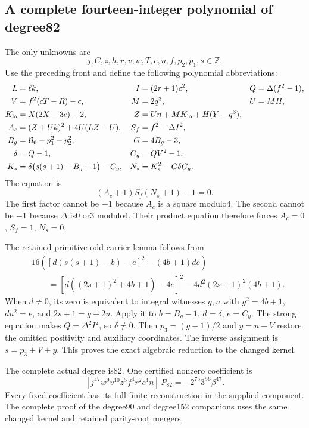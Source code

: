 \subsection{A complete fourteen-integer polynomial of degree82}
The only unknowns are
\[
 j,C,z,h,r,v,w,T,c,n,f,p_2,p_1,s\in\mathbb Z.
\]
Use the preceding front and define the following polynomial abbreviations:
\begin{align*}
 L&=\ell k,& I&=(2r+1)c^2,&Q&=\Delta(f^2-1),\\
 V&=f^2(cT-R)-c,& M&=2q^3,&U&=MH,\\
 K_{\rm lo}&=X(2X-3c)-2,
 &Z&=Un+MK_{\rm lo}+H(Y-q^3),\\
 A_c&=(Z+Uk)^2+4U(LZ-U),
 &S_f&=f^2-\Delta I^2,\\
 B_g&=\mathcal B_6-p_1^2-p_2^2,
 &G&=4B_g-3,\\
 \delta&=Q-1,&C_y&=QV^2-1,\\
 K_s&=\delta\bigl(s(s+1)-B_g+1\bigr)-C_y,
 &N_s&=K_s^2-G\delta C_y.
\end{align*}
The equation is
\begin{equation}\label{eq:integer82}
 \boxed{(A_c+1)S_f(N_s+1)-1=0.}
\end{equation}
The first factor cannot be $-1$ because $A_c$ is a square modulo4.
The second cannot be $-1$ because $\Delta$ is0 or3 modulo4.
Their product equation therefore forces $A_c=0$, $S_f=1$, $N_s=0$.

The retained primitive odd-carrier lemma follows from
\begin{align*}
 &16\left([d(s(s+1)-b)-e]^2-(4b+1)de\right)\\
 &\qquad=[d((2s+1)^2+4b+1)-4e]^2
       -4d^2(2s+1)^2(4b+1).
\end{align*}
When $d\ne0$, its zero is equivalent to integral witnesses $g,u$ with
$g^2=4b+1$, $du^2=e$, and $2s+1=g+2u$.
Apply it to $b=B_g-1$, $d=\delta$, $e=C_y$.
The strong equation makes $Q=\Delta^2I^2$, so $\delta\ne0$.
Then $p_3=(g-1)/2$ and $y=u-V$ restore the omitted positivity and
auxiliary coordinates. The inverse assignment is $s=p_3+V+y$.
This proves the exact algebraic reduction to the changed kernel.

The complete actual degree is82. One certified nonzero coefficient is
\[
 [j^{47}w^9v^{10}z^5f^4r^2c^4n]\,P_{82}
       =-2^{75}3^{56}\beta^{47}.
\]
Every fixed coefficient has its full finite reconstruction in the supplied
component. The complete proof of the degree90 and degree152 companions
uses the same changed kernel and retained parity-root mergers.

